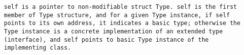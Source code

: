 \tt{self} is a pointer to non-modifiable \tt{struct Type}.
\tt{self} is the first member of \tt{Type} structure, and for a given \tt{Type}
instance, if \tt{self} points to its own address, it indicates a basic type;
otherwise the \tt{Type} instance is a concrete implementation
of an extended type (interface), and \tt{self} points
to basic \tt{Type} instance of the implementing class.

\enlargethispage*{\baselineskip}
